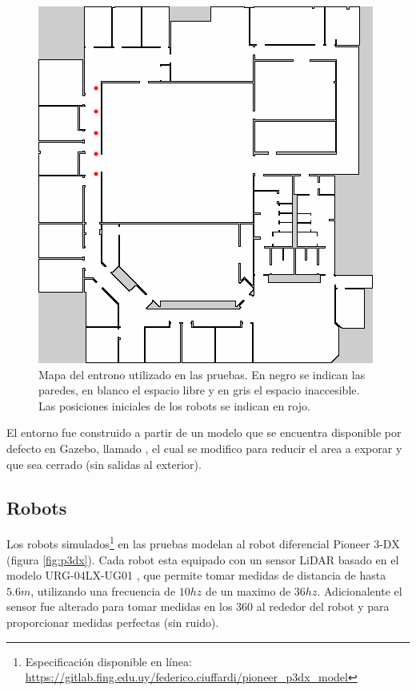 \begin{figure}[H]
  \center
  \includegraphics[width=0.5\linewidth]{imagenes/willow/0_250000mRobots2.png}
  \caption[Mapa del entrono utilizado en las pruebas.]{Mapa del entrono utilizado en las pruebas. En negro se indican las paredes, en blanco el espacio libre y en gris el espacio inaccesible. Las posiciones iniciales de los robots se indican en rojo.}
  \label{fig:willow}
\end{figure} 

El entorno fue construido a partir de un modelo que se encuentra disponible por
defecto en Gazebo, llamado , el cual se modifico para
reducir el area a exporar y que sea cerrado (sin salidas al exterior).

\subsection{Robots}
Los robots simulados\footnote{Especificación disponible en línea:
\url{https://gitlab.fing.edu.uy/federico.ciuffardi/pioneer_p3dx_model}} en las
pruebas modelan al robot diferencial Pioneer 3-DX \cite{p3dx} (figura
\ref{fig:p3dx}). Cada robot esta equipado con un sensor LiDAR basado en el
modelo URG-04LX-UG01 \cite{hokuyo}, que permite tomar medidas de distancia de
hasta $5.6m$, utilizando una frecuencia de $10hz$ de un maximo de $36hz$.
Adicionalente el sensor fue alterado para tomar medidas en los $360$\textdegree
al rededor del robot y para proporcionar medidas perfectas (sin ruido).

